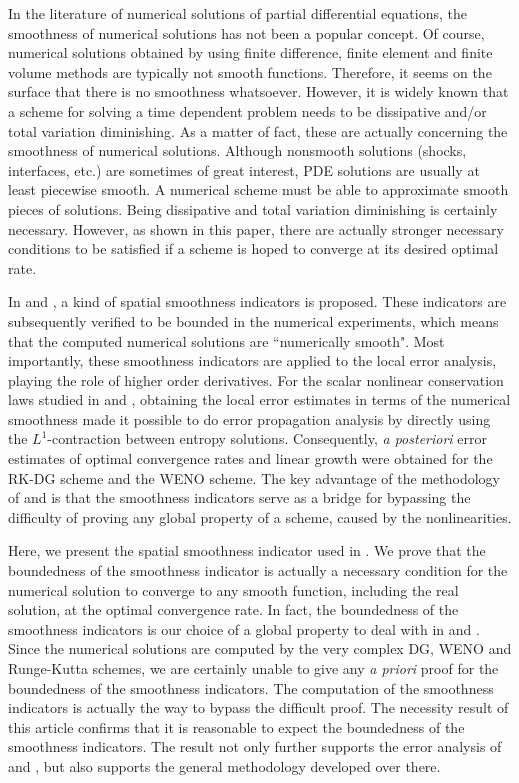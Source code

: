 \documentclass{article}
\numberwithin{equation}{section}
\begin{document}
\begin{spacing}{1.15}
In the literature of numerical solutions of partial differential
equations, the smoothness of numerical solutions has not been a
popular concept. Of course, numerical solutions obtained by using
finite difference, finite element and finite volume methods are
typically not smooth functions. Therefore, it seems on the surface
that there is no smoothness whatsoever. However, it is widely known
that a scheme for solving a time dependent problem needs to be
dissipative and/or total variation diminishing. As a matter of
fact, these are actually concerning the smoothness of numerical
solutions. Although nonsmooth solutions (shocks, interfaces, etc.) are sometimes of great interest,
PDE solutions are usually at least piecewise smooth. A numerical scheme must
be able to approximate smooth pieces of solutions. Being dissipative and total variation
diminishing is certainly necessary. However, as shown in this paper, there are actually
stronger necessary conditions
to be satisfied if a scheme is hoped to converge at its desired optimal rate.

In \cite{rumsey} and \cite{sun}, a kind of spatial smoothness
indicators is proposed. These indicators are subsequently verified to be
bounded in the numerical experiments, which means that the computed numerical solutions
are ``numerically smooth". Most importantly, these smoothness indicators are
applied to the local error analysis, playing the role of higher order derivatives.
For the scalar nonlinear conservation laws studied in \cite{rumsey}
and \cite{sun}, obtaining the local error estimates in terms of the numerical
smoothness made it possible to do error propagation
analysis by directly using the $L^1$-contraction between entropy
solutions. Consequently, {\it a posteriori} error estimates of
optimal convergence rates and linear growth were obtained for the
RK-DG scheme and the WENO scheme. The key advantage of the methodology of  \cite{rumsey}
and \cite{sun} is that the smoothness indicators serve as a bridge
for bypassing the difficulty of proving any global property of a scheme, caused by the nonlinearities.

Here, we present the spatial smoothness indicator used in \cite{sun}.
We prove that the boundedness of the smoothness indicator is
actually a necessary condition for the numerical
solution to converge to any smooth function, including the real
solution, at the optimal convergence rate. In fact, the boundedness of the smoothness indicators 
is our choice of a global property to deal with in \cite{rumsey} and \cite{sun}. Since the numerical solutions are
computed by the very complex DG, WENO and Runge-Kutta schemes, we are
certainly unable to give any {\it a priori} proof for the
boundedness of the smoothness indicators. 
The computation of the smoothness indicators is actually the way 
to bypass the difficult proof. The necessity result of this article confirms that it is reasonable to expect 
the boundedness of the smoothness indicators. The result not only further
supports the error analysis of  \cite{rumsey} and \cite{sun}, but also supports the general methodology developed over there.


\end{spacing}
\end{document}
